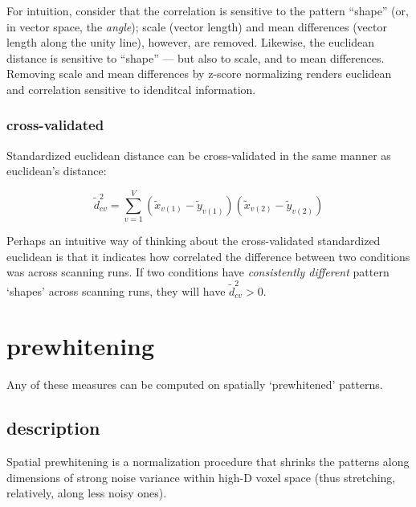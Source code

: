 \documentclass{article}\usepackage[]{graphicx}\usepackage[]{color}
\begin{document}
For intuition, consider that the correlation is sensitive to the pattern ``shape'' (or, in vector space, the \textit{angle}); scale (vector length) and mean differences (vector length along the unity line), however, are removed.
Likewise, the euclidean distance is sensitive to ``shape'' --- but also to scale, and to mean differences.
Removing scale and mean differences by z-score normalizing renders euclidean and correlation sensitive to idenditcal information.

\subsubsection*{cross-validated}

Standardized euclidean distance can be cross-validated in the same manner as euclidean's distance:

\begin{equation}
  \widetilde{d}^2_\textit{cv} = \sum_{v = 1}^{V}(\widetilde{x}_{v(1)} - \widetilde{y}_{v(1)})(\widetilde{x}_{v(2)} - \widetilde{y}_{v(2)})
\end{equation}

Perhaps an intuitive way of thinking about the cross-validated standardized euclidean is that it indicates how correlated the difference between two conditions was across scanning runs.
If two conditions have \textit{consistently different} pattern `shapes' across scanning runs, they will have $\widetilde{d}^2_\textit{cv} > 0$.

\section*{prewhitening}

Any of these measures can be computed on spatially `prewhitened' patterns.

\subsection*{description}

Spatial prewhitening is a normalization procedure that shrinks the patterns along dimensions of strong noise variance within high-D voxel space (thus stretching, relatively, along less noisy ones).
\end{document}
